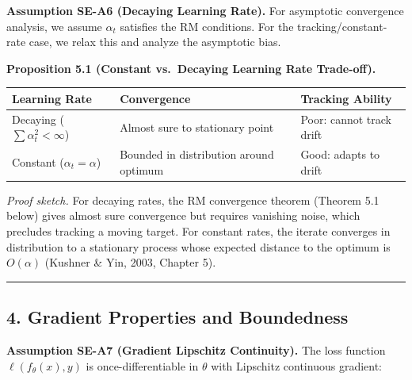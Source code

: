 \documentclass[
  12pt,
]{article}
\begin{document}
\textbf{Assumption SE-A6 (Decaying Learning Rate).} For asymptotic
convergence analysis, we assume \(\alpha_t\) satisfies the RM
conditions. For the tracking/constant-rate case, we relax this and
analyze the asymptotic bias.

\textbf{Proposition 5.1 (Constant vs.~Decaying Learning Rate
Trade-off).}

\begin{longtable}[]{@{}
  >{\raggedright\arraybackslash}p{}
  >{\raggedright\arraybackslash}p{}
  >{\raggedright\arraybackslash}p{}@{}}
\toprule\noalign{}
\begin{minipage}[b]{\linewidth}\raggedright
Learning Rate
\end{minipage} & \begin{minipage}[b]{\linewidth}\raggedright
Convergence
\end{minipage} & \begin{minipage}[b]{\linewidth}\raggedright
Tracking Ability
\end{minipage} \\
\midrule\noalign{}
\endhead
\bottomrule\noalign{}
\endlastfoot
Decaying (\(\sum \alpha_t^2 < \infty\)) & Almost sure to stationary
point & Poor: cannot track drift \\
Constant (\(\alpha_t = \alpha\)) & Bounded in distribution around
optimum & Good: adapts to drift \\
\end{longtable}

\emph{Proof sketch.} For decaying rates, the RM convergence theorem
(Theorem 5.1 below) gives almost sure convergence but requires vanishing
noise, which precludes tracking a moving target. For constant rates, the
iterate converges in distribution to a stationary process whose expected
distance to the optimum is \(O(\alpha)\) (Kushner \& Yin, 2003, Chapter
5).

\begin{center}\rule{0.5\linewidth}{0.5pt}\end{center}

\subsection{4. Gradient Properties and
Boundedness}\label{gradient-properties-and-boundedness}

\textbf{Assumption SE-A7 (Gradient Lipschitz Continuity).} The loss
function \(\ell(f_\theta(x), y)\) is once-differentiable in \(\theta\)
with Lipschitz continuous gradient:
\end{document}
